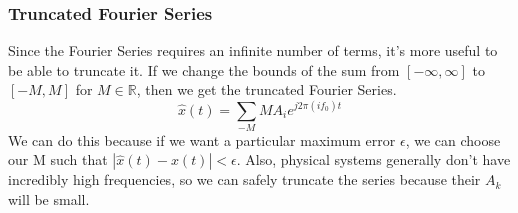\documentclass{article}
\begin{document}
\subsubsection{Truncated Fourier Series}
Since the Fourier Series requires an infinite number of terms, it's more useful to be able to truncate it.
If we change the bounds of the sum from $[-\infty, \infty]$ to $[-M, M]$ for $M\in\mathbb{R}$, then we get the truncated Fourier Series.
$$\hat{x}(t) = \sum_{-M}{M}{A_i e^{j2\pi(if_0)t}}$$
We can do this because if we want a particular maximum error $\epsilon$, we can choose our M such that $|\hat{x}(t)-x(t)|<\epsilon$.
Also, physical systems generally don't have incredibly high frequencies, so we can safely truncate the series because their $A_k$ will be small.
\end{document}

